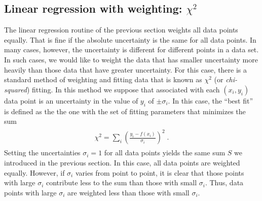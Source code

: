 \documentclass[letterpaper,10pt,english]{sphinxmanual}
\begin{document}

\subsection{Linear regression with weighting: \(\chi^2\)}
\label{chap7/chap7_funcs:index-6}\label{chap7/chap7_funcs:linear-regression-with-weighting}
The linear regression routine of the previous section weights all data points equally.  That is fine if the absolute uncertainty is the same for all data points.  In many cases, however, the uncertainty is different for different points in a data set.  In such cases, we would like to weight the data that has smaller uncertainty more heavily than those data that have greater uncertainty.  For this case, there is a standard method of weighting and fitting data that is known as \(\chi^2\)  (or \emph{chi-squared}) fitting.  In this method we suppose that associated with each \((x_{i},y_{i})\) data point is an uncertainty in the value of \(y_{i}\) of \(\pm\sigma_{i}\).  In this case, the ``best fit'' is defined as the the one with the set of fitting parameters that minimizes the sum
\label{chap7/chap7_funcs:equation-eq:chisq}\begin{gather}
\begin{split}\chi^2 = \sum_{i} \left(\frac{y_{i} - f(x_{i})} {\sigma_{i}}\right)^2 \;.\end{split}\label{chap7/chap7_funcs-eq:chisq}
\end{gather}
Setting the uncertainties \(\sigma_{i}=1\) for all data points yields the same sum \(S\) we introduced in the previous section.  In this case, all data points are weighted equally.  However, if \(\sigma_{i}\) varies from point to point, it is clear that those points with large \(\sigma_{i}\) contribute less to the sum than those with small \(\sigma_{i}\).  Thus, data points with large \(\sigma_{i}\) are weighted less than those with small \(\sigma_{i}\).
\end{document}
